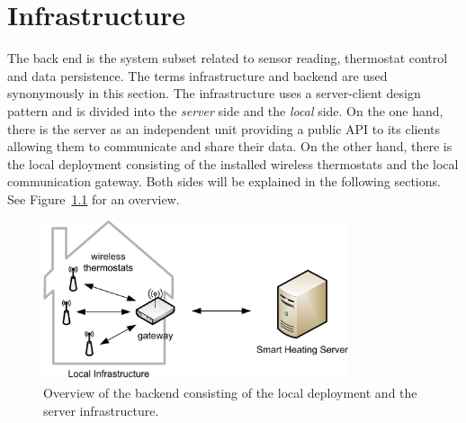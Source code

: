 
\chapter{Infrastructure}
\label{sec:infrastructure}




The back end is the system subset related to sensor reading, thermostat control and data persistence.
The terms infrastructure and backend are used synonymously in this section.
The infrastructure uses a server-client design pattern and is divided into the \emph{server} side and the \emph{local} side.
On the one hand, there is the server as an independent unit providing a public API to its clients allowing them to communicate and share their data.
On the other hand, there is the local deployment consisting of the installed wireless thermostats and the local communication gateway.
Both sides will be explained in the following sections.
See Figure~\ref{fig:backend} for an overview.

\begin{figure}[h]
	\begin{center}
		\includegraphics[width=0.8\textwidth]{images/Backend.png}
	\end{center}
	\caption{Overview of the backend consisting of the local deployment and the server infrastructure.}
	\label{fig:backend}
\end{figure}
